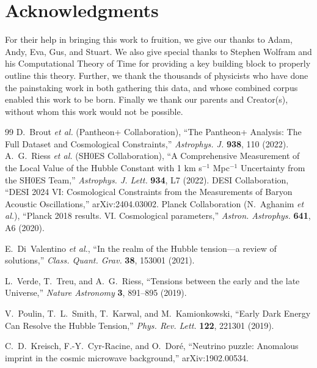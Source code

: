 \documentclass[10pt]{article}
\begin{document}
\section*{Acknowledgments}
\label{sec:ack}
For their help in bringing this work to fruition, we give our thanks to Adam, Andy, Eva, Gus, and Stuart. 
We also give special thanks to Stephen Wolfram and his Computational Theory of Time for providing a key 
building block to properly outline this theory. Further, we thank the thousands of physicists who have done the
painstaking work in both gathering this data, and whose combined corpus enabled this work to be born. Finally we 
thank our parents and Creator(s), without whom this work would not be possible.
\begin{thebibliography}{99}
D.~Brout \emph{et al.} (Pantheon+ Collaboration),
``The Pantheon+ Analysis: The Full Dataset and Cosmological Constraints,''
\emph{Astrophys. J.} \textbf{938}, 110 (2022).
A.~G.~Riess \emph{et al.} (SH0ES Collaboration),
``A Comprehensive Measurement of the Local Value of the Hubble Constant with 1 km s$^{-1}$ Mpc$^{-1}$ Uncertainty from the SH0ES Team,''
\emph{Astrophys. J. Lett.} \textbf{934}, L7 (2022).
DESI Collaboration,
``DESI 2024 VI: Cosmological Constraints from the Measurements of Baryon Acoustic Oscillations,''
arXiv:2404.03002.
Planck Collaboration (N.~Aghanim \emph{et al.}),
``Planck 2018 results. VI. Cosmological parameters,''
\emph{Astron. Astrophys.} \textbf{641}, A6 (2020).

E.~Di~Valentino \emph{et al.},
``In the realm of the Hubble tension---a review of solutions,''
\emph{Class. Quant. Grav.} \textbf{38}, 153001 (2021).

L.~Verde, T.~Treu, and A.~G.~Riess,
``Tensions between the early and the late Universe,''
\emph{Nature Astronomy} \textbf{3}, 891--895 (2019).

V.~Poulin, T.~L.~Smith, T.~Karwal, and M.~Kamionkowski,
``Early Dark Energy Can Resolve the Hubble Tension,''
\emph{Phys. Rev. Lett.} \textbf{122}, 221301 (2019).

C.~D.~Kreisch, F.-Y.~Cyr-Racine, and O.~Dor\'e,
``Neutrino puzzle: Anomalous imprint in the cosmic microwave background,''
arXiv:1902.00534.


\end{thebibliography}
\end{document}
